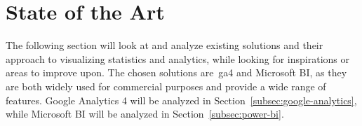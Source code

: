 \section{State of the Art}\label{sec:state-of-the-art}

The following section will look at and analyze existing solutions and their approach to visualizing statistics and
analytics, while looking for inspirations or areas to improve upon.
The chosen solutions are~\acrlong{ga4} and Microsoft BI, as they are both widely used for commercial purposes and
provide a wide range of features.
Google Analytics 4 will be analyzed in Section~\ref{subsec:google-analytics}, while Microsoft BI will be analyzed in
Section~\ref{subsec:power-bi}.



